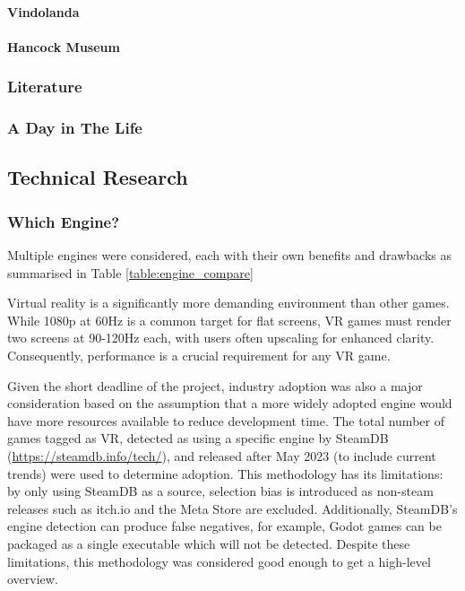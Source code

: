 \documentclass[sigconf,authordraft]{acmart}
\begin{document}
\paragraph{Vindolanda}

\paragraph{Hancock Museum}

\subsubsection{Literature}

\subsubsection{A Day in The Life}

\subsection{Technical Research}

\subsubsection{Which Engine?}

Multiple engines were considered, each with their own benefits
and drawbacks as summarised in Table \ref{table:engine_compare}

Virtual reality is a significantly more demanding environment than other games.
While 1080p at 60Hz is a common target for flat screens, VR games must render
two screens at 90-120Hz each, with users often upscaling for enhanced clarity.
Consequently, performance is a crucial requirement for any VR game.

Given the short deadline of the project, industry adoption was also a major
consideration based on the assumption that a more widely adopted engine would
have more resources available to reduce development time. The total number of
games tagged as VR, detected as using a specific engine by
SteamDB (\url{https://steamdb.info/tech/}), and released
after May 2023 (to include current trends) were used to determine adoption.
This methodology has its limitations: by only using SteamDB as a source,
selection bias is introduced as non-steam releases such as itch.io and the Meta
Store are excluded. Additionally, SteamDB's engine detection can produce false
negatives, for example, Godot games can be packaged as a single executable which
will not be detected. Despite these limitations, this methodology was considered
good enough to get a high-level overview.
\end{document}
